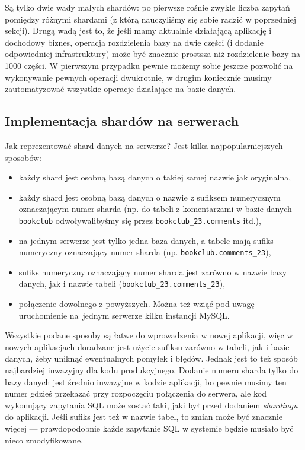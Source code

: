 \documentclass[a4paper,12pt]{article}
\begin{document}
Są tylko dwie wady małych shardów: po pierwsze rośnie zwykle liczba zapytań pomiędzy różnymi shardami (z którą nauczyliśmy się sobie radzić w poprzedniej sekcji). Drugą wadą jest to, że jeśli mamy aktualnie działającą aplikację i dochodowy biznes, operacja rozdzielenia bazy na dwie części (i dodanie odpowiedniej infrastruktury) może być znacznie prostsza niż rozdzielenie bazy na 1000 części. W pierwszym przypadku pewnie możemy sobie jeszcze pozwolić na wykonywanie pewnych operacji dwukrotnie, w drugim koniecznie musimy zautomatyzować wszystkie operacje działające na bazie danych.

\subsection{Implementacja shardów na serwerach}

Jak reprezentować shard danych na serwerze? Jest kilka najpopularniejszych sposobów:

\begin{itemize}
 \setlength{\itemsep}{0.06cm}
 \setlength{\parskip}{0.06cm}
 \item każdy shard jest osobną bazą danych o takiej samej nazwie jak oryginalna,
 \item każdy shard jest osobną bazą danych o nazwie z sufiksem numerycznym oznaczającym numer sharda (np. do tabeli z komentarzami w bazie danych \texttt{bookclub} odwoływalibyśmy się przez \texttt{bookclub\_23.comments} itd.),
 \item na jednym serwerze jest tylko jedna baza danych, a tabele mają sufiks numeryczny oznaczający numer sharda (np. \texttt{bookclub.comments\_23}),
 \item sufiks numeryczny oznaczający numer sharda jest zarówno w nazwie bazy danych, jak i nazwie tabeli (\texttt{bookclub\_23.comments\_23}),
 \item połączenie dowolnego z powyższych. Można też wziąć pod uwagę uruchomienie na~jednym serwerze kilku instancji MySQL.
\end{itemize}

Wszystkie podane sposoby są łatwe do wprowadzenia w nowej aplikacji, więc w nowych aplikacjach doradzane jest użycie sufiksu zarówno w tabeli, jak i bazie danych, żeby uniknąć ewentualnych pomyłek i błędów. Jednak jest to też sposób najbardziej inwazyjny dla kodu produkcyjnego. Dodanie numeru sharda tylko do bazy danych jest średnio inwazyjne w kodzie aplikacji, bo pewnie musimy ten numer gdzieś przekazać przy rozpoczęciu połączenia do serwera, ale kod wykonujący zapytania SQL może zostać taki, jaki był przed dodaniem \textit{shardingu} do aplikacji. Jeśli sufiks jest też w nazwie tabel, to zmian może być znacznie więcej --- prawdopodobnie każde zapytanie SQL w systemie będzie musiało być nieco zmodyfikowane.
\end{document}
